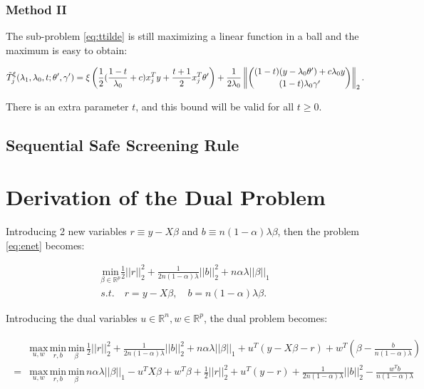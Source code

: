 \subsubsection{Method II}

The sub-problem \eqref{eq:ttilde} is still maximizing a linear function in a ball and the maximum is easy to obtain:

\begin{gather}
    \label{eq:ttildexi.alt}
    \begin{aligned}
        \Tilde{T}^\xi_j(\lambda_1,\lambda_0,t;\theta',\gamma')=\xi\left( \frac{1}{2}(\frac{1-t}{\lambda_0}+c)x_j^Ty+\frac{t+1}{2}x_j^T\theta'\right)+\frac{1}{2\lambda_0}\left\Vert\binom{(1-t)(y-\lambda_0\theta')+c\lambda_0y}{(1-t)\lambda_0\gamma'}\right\Vert_2.\\
    \end{aligned}
\end{gather}

There is an extra parameter $t$, and this bound will be valid for all $t\geq 0$.

\subsection{Sequential Safe Screening Rule}


\appendix
\appendixpage


\section{Derivation of the Dual Problem}


Introducing 2 new variables $r\equiv y-X\beta$ and $b\equiv n(1-\alpha)\lambda \beta$, then the problem \eqref{eq:enet} becomes:

\begin{equation}
    \label{eq:dual+rb}
    \begin{gathered}
    \underset{\beta\in \mathbb{R}^p}{\mathrm{min}}\frac{1}{2}||r||_2^2+\frac{1}{2n(1-\alpha)\lambda}||b||_2^2+n\alpha\lambda||\beta||_1\\s.t.\quad r=y-X\beta,\quad b=n(1-\alpha)\lambda \beta.
\end{gathered}
\end{equation}

Introducing the dual variables $u\in\mathbb{R}^{n},w\in\mathbb{R}^p$, the dual problem becomes:

\begin{gather}
    \label{eq:dual+uw}
    \begin{aligned}
        &\underset{u,w}{\mathrm{max}}\,\underset{r,b}{\mathrm{min}}\,\underset{\beta}{\mathrm{min}}\,\frac{1}{2}||r||_2^2+\frac{1}{2n(1-\alpha)\lambda}||b||_2^2+n\alpha\lambda||\beta||_1+u^T(y-X\beta-r)+w^T\left(\beta-\frac{b}{n(1-\alpha)\lambda}\right)\\
        =&\underset{u,w}{\mathrm{max}}\,\underset{r,b}{\mathrm{min}}\,\underset{\beta}{\mathrm{min}}\,n\alpha\lambda||\beta||_1-u^TX\beta+w^T\beta+\frac{1}{2}||r||_2^2+u^T(y-r)+\frac{1}{2n(1-\alpha)\lambda}||b||_2^2-\frac{w^Tb}{n(1-\alpha)\lambda}
    \end{aligned}    
\end{gather}


